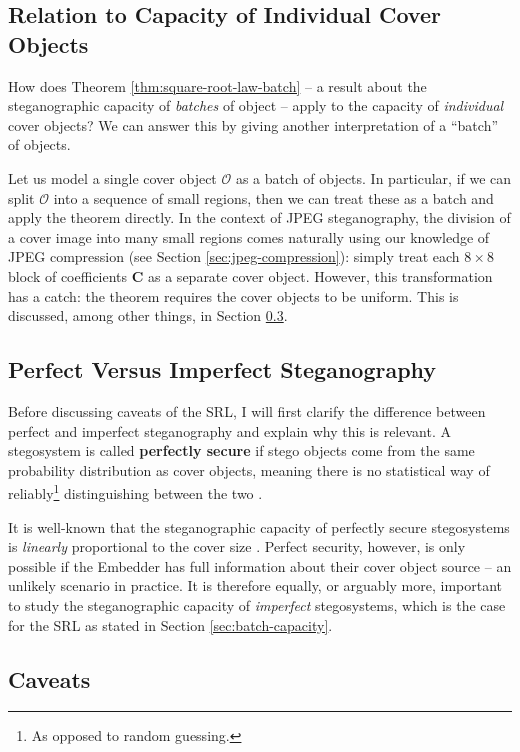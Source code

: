 \documentclass[11pt,a4paper,twoside,openright]{report}
\begin{document}
\subsection{Relation to Capacity of Individual Cover Objects}

How does Theorem \ref{thm:square-root-law-batch} -- a result about the steganographic capacity of \textit{batches} of object -- apply to the capacity of \textit{individual} cover objects? We can answer this by giving another interpretation of a ``batch'' of objects.

Let us model a single cover object $\mathcal{O}$ as a batch of objects. In particular, if we can split $\mathcal{O}$ into a sequence of small regions, then we can treat these as a batch and apply the theorem directly. In the context of JPEG steganography, the division of a cover image into many small regions comes naturally using our knowledge of JPEG compression (see Section \ref{sec:jpeg-compression}): simply treat each $8\times8$ block of coefficients $\bm{C}$ as a separate cover object. However, this transformation has a catch: the theorem requires the cover objects to be uniform. This is discussed, among other things, in Section \ref{sec:srl-caveats}.


\subsection{Perfect Versus Imperfect Steganography}

Before discussing caveats of the SRL, I will first clarify the difference between perfect and imperfect steganography and explain why this is relevant. A stegosystem is called \textbf{perfectly secure} if stego objects come from the same probability distribution as cover objects, meaning there is no statistical way of reliably\footnote{As opposed to random guessing.} distinguishing between the two \cite{perfect-steganography}.

It is well-known that the steganographic capacity of perfectly secure stegosystems is \textit{linearly} proportional to the cover size \cite{srl-markov-covers}. Perfect security, however, is only possible if the Embedder has full information about their cover object source -- an unlikely scenario in practice. It is therefore equally, or arguably more, important to study the steganographic capacity of \textit{imperfect} stegosystems, which is the case for the SRL as stated in Section \ref{sec:batch-capacity}.


\subsection{Caveats} \label{sec:srl-caveats}
\end{document}
